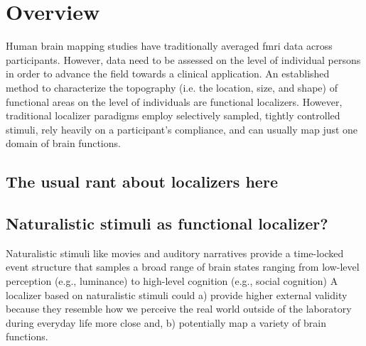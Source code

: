 \section{Overview}





Human brain mapping studies have traditionally averaged \ac{fmri} data across
participants.
%
However, data need to be assessed on the level of individual persons in order to
advance the field towards a clinical application.
An established method to characterize the topography (i.e. the location, size,
and shape) of functional areas on the level of individuals are functional
localizers.
However, traditional localizer paradigms employ selectively sampled, tightly
controlled stimuli, rely heavily on a participant's compliance, and can usually
map just one domain of brain functions.


\subsection{The usual rant about localizers here}




\subsection{Naturalistic stimuli as functional localizer?}


Naturalistic stimuli like movies and auditory narratives \citep[cf.][for
reviews]{jaaskelainen2021movies, jaaskelainen2020neural} provide a time-locked
event structure that samples a broad range of brain states ranging from
low-level perception (e.g., luminance) to high-level cognition (e.g., social
cognition)
%
A localizer based on naturalistic stimuli could
%
a) provide higher external validity because they resemble how we perceive the
real world outside of the laboratory during everyday life more close and,
%
b) potentially map a variety of brain functions.

